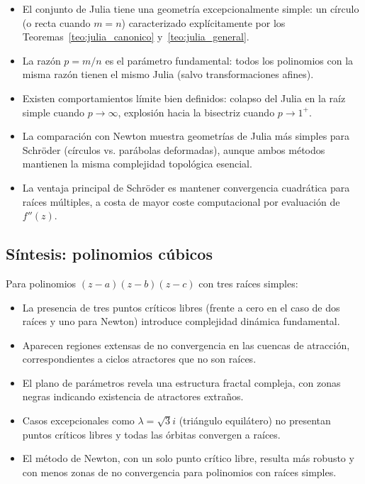 \begin{itemize}
\item El conjunto de Julia tiene una geometría excepcionalmente simple: un círculo (o recta cuando $m=n$) caracterizado explícitamente por los Teoremas~\ref{teo:julia_canonico} y~\ref{teo:julia_general}.

\item La razón $p=m/n$ es el parámetro fundamental: todos los polinomios con la misma razón tienen el mismo Julia (salvo transformaciones afines).

\item Existen comportamientos límite bien definidos: colapso del Julia en la raíz simple cuando $p\to\infty$, explosión hacia la bisectriz cuando $p\to 1^+$.

\item La comparación con Newton muestra geometrías de Julia más simples para Schröder (círculos vs. parábolas deformadas), aunque ambos métodos mantienen la misma complejidad topológica esencial.

\item La ventaja principal de Schröder es mantener convergencia cuadrática para raíces múltiples, a costa de mayor coste computacional por evaluación de $f''(z)$.
\end{itemize}

\subsection{Síntesis: polinomios cúbicos}

Para polinomios $(z-a)(z-b)(z-c)$ con tres raíces simples:

\begin{itemize}
\item La presencia de tres puntos críticos libres (frente a cero en el caso de dos raíces y uno para Newton) introduce complejidad dinámica fundamental.

\item Aparecen regiones extensas de no convergencia en las cuencas de atracción, correspondientes a ciclos atractores que no son raíces.

\item El plano de parámetros revela una estructura fractal compleja, con zonas negras indicando existencia de atractores extraños.

\item Casos excepcionales como $\lambda=\sqrt{3}i$ (triángulo equilátero) no presentan puntos críticos libres y todas las órbitas convergen a raíces.

\item El método de Newton, con un solo punto crítico libre, resulta más robusto y con menos zonas de no convergencia para polinomios con raíces simples.
\end{itemize}

